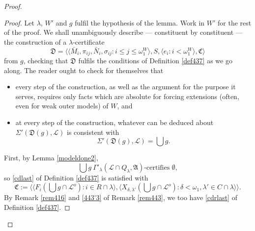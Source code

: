 \documentclass[12pt]{article}
\numberwithin{equation}{section}
\begin{document}
\begin{proof}
\begin{proof}
Let $\lambda$, $W'$ and $g$ fulfil the hypothesis of the lemma. Work in $W'$ for the rest of the proof. We shall unambiguously describe --- constituent by constituent --- the construction of a $\lambda$-certificate
\begin{equation*}
    \mathfrak{D} = \langle \langle \bar{M}_i, \pi_{ij}, \bar{N}_i, \sigma_{ij} : i \leq j \leq \omega_1^{W} \rangle, S, \langle e_i : i < \omega_1^W \rangle, \mathfrak{C} \rangle
\end{equation*}
from $g$, checking that $\mathfrak{D}$ fulfils the conditions of Definition \ref{def437} as we go along. The reader ought to check for themselves that 
\begin{itemize}
    \item every step of the construction, as well as the argument for the purpose it serves, requires only facts which are absolute for forcing extensions (often, even for weak outer models) of $W$, and
    \item at every step of the construction, whatever can be deduced about $\Sigma'(\mathfrak{D}(g), \mathcal{L})$ is consistent with 
    \begin{equation*}
        \Sigma'(\mathfrak{D}(g), \mathcal{L}) = \bigcup g \text{.}
    \end{equation*}
\end{itemize}

First, by Lemma \ref{modeldone2}, 
\begin{equation*}
    \bigcup g \ \Gamma'_{\lambda} (\mathcal{L} \cap Q_{\lambda}, \mathfrak{A}) \text{-certifies } \emptyset \text{,}
\end{equation*}
so \ref{cdlast} of Definition \ref{def437} is satisfied with
\begin{equation*}
    \mathfrak{C} := \langle \langle F_i(\bigcup g \cap \mathcal{L}^o) : i \in R \cap \lambda \rangle, \langle X_{\delta, \lambda'}(\bigcup g \cap \mathcal{L}^o) : \delta < \omega_1, \lambda' \in C \cap \lambda \rangle \rangle \text{.}
\end{equation*}
By Remark \ref{rem416} and \ref{443'3} of Remark \ref{rem443}, we too have \ref{cdrlast} of Definition \ref{def437}. 


\end{proof}
\end{proof}
\end{document}
